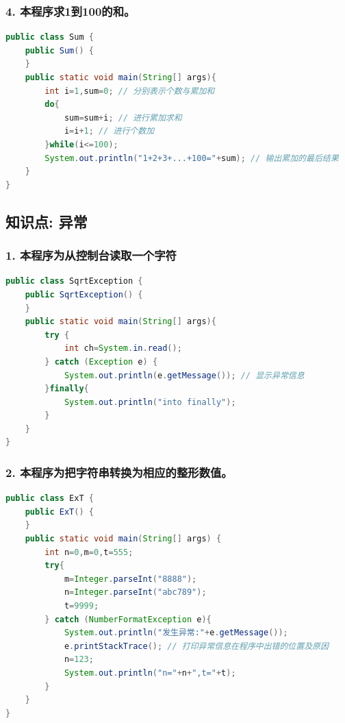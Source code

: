 \documentclass[a4paper,12pt]{article}
\begin{document}
\subsubsection{4. 本程序求1到100的和。}

\begin{lstlisting}[language=Java, caption=求1到100的和]
public class Sum {
    public Sum() {
    }
    public static void main(String[] args){
        int i=1,sum=0; // 分别表示个数与累加和
        do{
            sum=sum+i; // 进行累加求和
            i=i+1; // 进行个数加
        }while(i<=100);
        System.out.println("1+2+3+...+100="+sum); // 输出累加的最后结果
    }
}
\end{lstlisting}

\subsection{知识点: 异常}

\subsubsection{1. 本程序为从控制台读取一个字符}

\begin{lstlisting}[language=Java, caption=从控制台读取一个字符]
public class SqrtException {
    public SqrtException() {
    }
    public static void main(String[] args){
        try {
            int ch=System.in.read();
        } catch (Exception e) {
            System.out.println(e.getMessage()); // 显示异常信息
        }finally{
            System.out.println("into finally");
        }
    }
}
\end{lstlisting}

\subsubsection{2. 本程序为把字符串转换为相应的整形数值。}

\begin{lstlisting}[language=Java, caption=字符串转换为整型数值]
public class ExT {
    public ExT() {
    }
    public static void main(String[] args) {
        int n=0,m=0,t=555;
        try{
            m=Integer.parseInt("8888");
            n=Integer.parseInt("abc789");
            t=9999;
        } catch (NumberFormatException e){
            System.out.println("发生异常:"+e.getMessage());
            e.printStackTrace(); // 打印异常信息在程序中出错的位置及原因
            n=123;
            System.out.println("n="+n+",t="+t);
        }
    }
}
\end{lstlisting}
\end{document}
